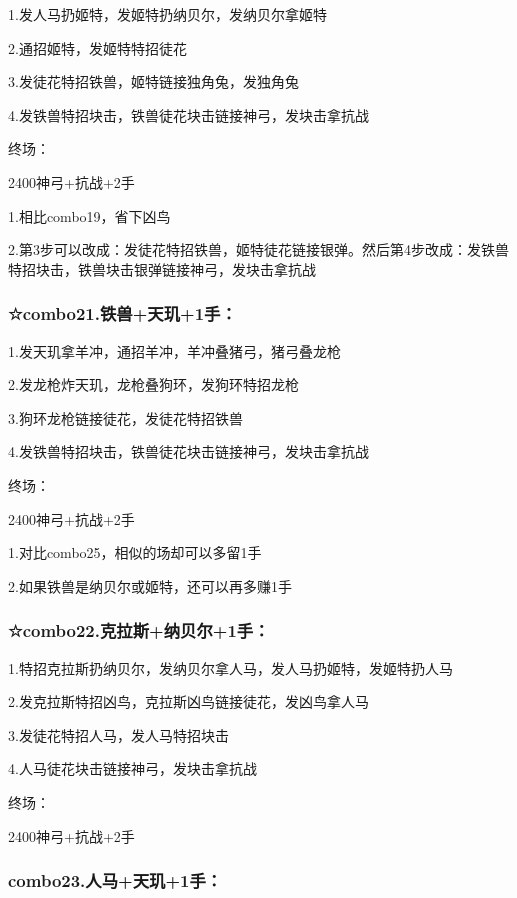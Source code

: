 \documentclass[
]{article}
\begin{document}
1.发人马扔姬特，发姬特扔纳贝尔，发纳贝尔拿姬特

2.通招姬特，发姬特特招徒花

3.发徒花特招铁兽，姬特链接独角兔，发独角兔

4.发铁兽特招块击，铁兽徒花块击链接神弓，发块击拿抗战

终场：

2400神弓+抗战+2手

1.相比combo19，省下凶鸟

2.第3步可以改成：发徒花特招铁兽，姬特徒花链接银弹。然后第4步改成：发铁兽特招块击，铁兽块击银弹链接神弓，发块击拿抗战

\hypertarget{combo21.ux94c1ux517dux5929ux73911ux624b}{%
\subsubsection{☆combo21.铁兽+天玑+1手：}\label{combo21.ux94c1ux517dux5929ux73911ux624b}}

1.发天玑拿羊冲，通招羊冲，羊冲叠猪弓，猪弓叠龙枪

2.发龙枪炸天玑，龙枪叠狗环，发狗环特招龙枪

3.狗环龙枪链接徒花，发徒花特招铁兽

4.发铁兽特招块击，铁兽徒花块击链接神弓，发块击拿抗战

终场：

2400神弓+抗战+2手

1.对比combo25，相似的场却可以多留1手

2.如果铁兽是纳贝尔或姬特，还可以再多赚1手

\hypertarget{combo22.ux514bux62c9ux65afux7eb3ux8d1dux5c141ux624b}{%
\subsubsection{☆combo22.克拉斯+纳贝尔+1手：}\label{combo22.ux514bux62c9ux65afux7eb3ux8d1dux5c141ux624b}}

1.特招克拉斯扔纳贝尔，发纳贝尔拿人马，发人马扔姬特，发姬特扔人马

2.发克拉斯特招凶鸟，克拉斯凶鸟链接徒花，发凶鸟拿人马

3.发徒花特招人马，发人马特招块击

4.人马徒花块击链接神弓，发块击拿抗战

终场：

2400神弓+抗战+2手

\hypertarget{combo23.ux4ebaux9a6cux5929ux73911ux624b}{%
\subsubsection{combo23.人马+天玑+1手：}\label{combo23.ux4ebaux9a6cux5929ux73911ux624b}}
\end{document}
